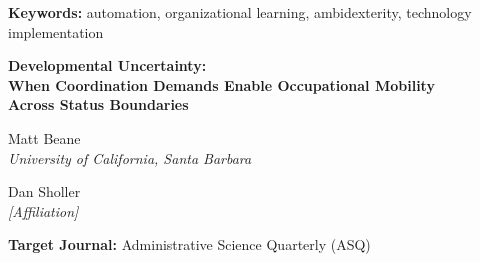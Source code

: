 \documentclass[12pt]{article}
\begin{document}
\noindent\textbf{Keywords:} automation, organizational learning, ambidexterity, technology implementation

\newpage

\begin{center}
{\Large\bfseries Developmental Uncertainty:\\[0.3em]
When Coordination Demands Enable Occupational Mobility\\[0.3em]
Across Status Boundaries}

\vspace{1em}

Matt Beane\\
\textit{University of California, Santa Barbara}

\vspace{0.5em}

Dan Sholler\\
\textit{[Affiliation]}
\end{center}

\vspace{1em}

\begin{abstract}
Nonprofessionals increasingly work alongside professionals in technology development. Prior work is pessimistic: status boundaries are defended, knowledge is hoarded, and inclusion efforts tend toward extraction rather than development. We document a striking exception. In a three-year field study of an AI-enabled robotics vendor, nonprofessional ``drivers'' who joined during high-uncertainty phases built substantial technical skills---76\% advanced to professional roles, with 19\% moving into positions typically requiring credentials they lacked. Workers who joined later, with identical job design, had far more limited development. Drawing on contingency theory, we identify \textit{developmental uncertainty}: uncertainty drives cross-boundary coordination that enables skill transfer and occupational mobility across status boundaries. As uncertainty is consumed and encoded into automation, coordination demands decline, boundaries harden, and the developmental window closes. We draw on 145 interviews, 17 months of observation, and 33 million records of human-robot interaction to document this process.
\end{abstract}

\noindent\textbf{Target Journal:} Administrative Science Quarterly (ASQ)
\end{document}
